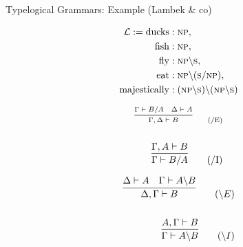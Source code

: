 \documentclass{beamer}
\begin{document}
\begin{frame}{Typelogical Grammars: Example (Lambek \& co)}
	\begin{minipage}{0.35\textwidth}
		\small
		\begin{align*}
		\mathcal{L} := 	\text{ducks} &: \textsc{np},  \\
						\text{fish} &: \textsc{np},  \\
						\text{fly} &: \textsc{np}\backslash \textsc{s}, \\
						\text{eat} &: \textsc{np}\backslash (\textsc{s} / \textsc{np}), \\
						\text{majestically} &: (\textsc{np}\backslash \textsc{s}) \backslash (\textsc{np} \backslash \textsc{s})
		\end{align*}
	\end{minipage}\begin{minipage}{0.45\textwidth}
	\scriptsize
		\begin{minipage}{0.6\textwidth}
		    \begin{align*}
		    	\scriptsize
		        \infer{\Gamma, \Delta \vdash B}{
		            \Gamma \vdash B / A
		            &
		            \Delta \vdash A
		        }\tag{/E}\\
		        \\
		        \infer{\Gamma \vdash B/A}{
		            \Gamma, A \vdash B
		        }\tag{/I}
		    \end{align*}
		 \end{minipage}\begin{minipage}{0.6\textwidth}
			    \begin{align*}
			        \infer{\Delta, \Gamma \vdash B}{
			            \Delta \vdash A
			            &
			            \Gamma \vdash A\backslash B
			        }\tag{$\backslash E$}\\
			        \\
			        \infer{\Gamma \vdash A\backslash B}{
			            A, \Gamma \vdash B
			        }\tag{$\backslash I$}
			    \end{align*}		
		\end{minipage}
	\end{minipage}
\end{frame}
\end{document}
